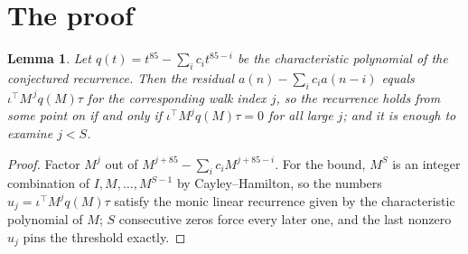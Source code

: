\documentclass[11pt,a4paper]{article}
\theoremstyle{plain}
\newtheorem{lemma}[theorem]{Lemma}
\theoremstyle{definition}
\begin{document}
\section{The proof}

\begin{lemma}\label{lem:crit}
Let $q(t)=t^{85}-\sum_i c_it^{85-i}$ be the characteristic polynomial of the
conjectured recurrence. Then the residual $a(n)-\sum_ic_ia(n-i)$ equals
$\iota^{\!\top}M^{\,j}q(M)\tau$ for the corresponding walk index $j$, so the
recurrence holds from some point on if and only if $\iota^{\!\top}M^{j}q(M)\tau=0$ for all
large $j$; and it is enough to examine $j<S$.
\end{lemma}

\begin{proof}
Factor $M^{j}$ out of $M^{j+85}-\sum_ic_iM^{j+85-i}$. For the bound, $M^{S}$
is an integer combination of $I,M,\dots,M^{S-1}$ by Cayley--Hamilton, so the numbers
$u_j=\iota^{\!\top}M^{j}q(M)\tau$ satisfy the monic linear recurrence given by the
characteristic polynomial of $M$; $S$ consecutive zeros force every later one, and the last
nonzero $u_j$ pins the threshold exactly.
\end{proof}
\end{document}
